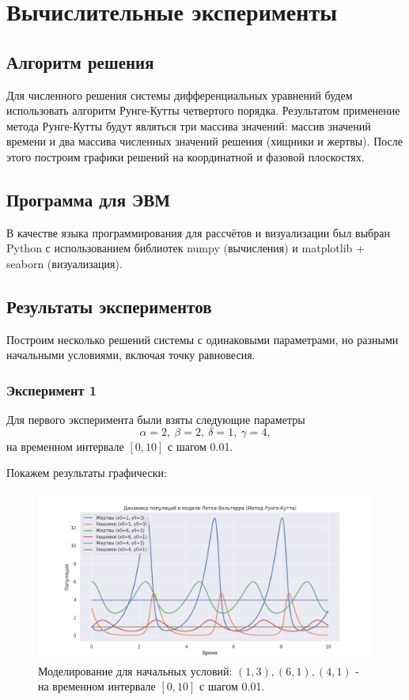 \chapter{Вычислительные эксперименты}
\section{Алгоритм решения}

Для численного решения системы дифференциальных уравнений будем использовать алгоритм Рунге-Кутты \cite{1964calculus} четвертого порядка. Результатом применение метода Рунге-Кутты будут являться три массива значений: массив значений времени и два массива численных значений решения (хищники и жертвы). После этого построим графики решений на координатной и фазовой плоскостях.

\section{Программа для ЭВМ}

В качестве языка программирования для рассчётов и визуализации был выбран Python с использованием библиотек numpy (вычисления) и matplotlib + seaborn (визуализация).

 

\section{Результаты экспериментов}
Построим несколько решений системы с одинаковыми параметрами, но разными начальными условиями, включая точку равновесия.
\subsection*{Эксперимент 1}
Для первого эксперимента были взяты следующие параметры $$\alpha = 2, \ \beta = 2, \ \delta = 1, \ \gamma = 4,$$
на временном интервале $[0,10]$ с шагом 0.01.
 
Покажем результаты графически:
\begin{figure}[h]  %
	\centering
	\includegraphics[width=1\textwidth]{imgs/pop_1.png}  %
	\caption{Моделирование для начальных условий: $(1,3), (6,1),(4,1)$ - на временном интервале $[0,10]$ с шагом 0.01.}  %
	\label{fig:pop_1}  %
\end{figure}

